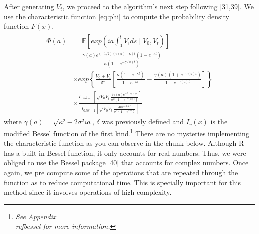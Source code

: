 \documentclass[12pt,twoside]{reedthesis}
\theoremstyle{definition}
\theoremstyle{definition}
\theoremstyle{remark}
\begin{document}
  After generating \(V_t\), we proceed to the algorithm's next step
  following {[}31,39{]}. We use the characteristic function \eqref{eq:phi}
  to compute the probability density function \(F(x)\).
  \begin{align} \label{eq:phi}
  \begin{split}
  \Phi(a) &= \mathbb{E}\left[ exp \left( ia \int_{0}^{t}{V_s ds} \mid V_0,V_t \right)  \right] \\[10pt]
  &= \frac{\gamma(a)e^{(-1/2)(\gamma(a)- \kappa) t} (1 - e^{- \kappa t})}{\kappa (1 - e^{- \gamma(a) t})} \\[10pt]
  &\times exp \left\{\frac{V_0 + V_t}{\sigma^2} \left[ \frac{\kappa (1 + e^{- \kappa t})}{1 - e^{- \kappa t}} - \frac{\gamma(a) (1 + e^{- \gamma(a) t})}{1 - e^{- \gamma(a) t}} \right] \right\} \\[10pt]
  &\times \frac{I_{0.5\delta - 1} \left[ \sqrt{V_0 V_t} \frac{4 \gamma(a) e^{-0.5 \gamma(a) t}}{\sigma^2 (1 - e^{- \gamma(a) t})} \right]}{I_{0.5\delta - 1}  \left[ \sqrt{V_0 V_t} \frac{4 \kappa e^{-0.5 \kappa t}}{\sigma^2 (1 - e^{- \kappa t})} \right]}
  \end{split}
  \end{align}
  where \(\gamma(a) = \sqrt{\kappa^2 - 2 \sigma^2 i a}\), \(\delta\) was
  previously defined and \(I_v(x)\) is the modified Bessel function of the
  first kind.\footnote{\textit{See Appendix  \\ref{bessel} for more information.}}
  There are no mysteries implementing the characteristic function as you
  can observe in the chunk below. Although R has a built-in Bessel
  function, it only accounts for real numbers. Thus, we were obliged to
  use the Bessel package {[}40{]} that accounts for complex numbers. Once
  again, we pre compute some of the operations that are repeated through
  the function as to reduce computational time. This is specially
  important for this method since it involves operations of high
  complexity.
  
\end{document}
